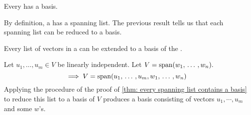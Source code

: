 \setcounter{thm}{30}
\begin{thm} 
  \label{thm: every finite-dimensional vector space has a basis}
  Every \findimvs has a basis.
\end{thm}
\begin{prf}
  By definition, a \fdvs has a spanning list. The previous result tells us that each spanning list can be reduced to a basis.
\end{prf}

\begin{thm}
  \label{thm: every linearly independent list of vectors in a finite-dimensional vector space can be extended to a basis of the vector space}
  Every \lid list of vectors in a  \findimvs can be extended to a basis of the \vs.
\end{thm}
\begin{prf}
  Let $u_1, \ldots, u_m \in V$ be linearly independent. Let $V=\operatorname{span} (w_1, {\, \ldots \,\,}, w_n).$
  \begin{equation}
    \implies V=\operatorname{span} (u_1, {\, \ldots \,\,} , u_m, w_1, {\, \ldots \,\,} , w_n )
  \end{equation}
  Applying the procedure of the proof of \ref{thm: every spanning list contains a basis} to reduce this list to a basis of $V$ produces a basis consisting of vectors $u_1, \cdots, u_m$ and some $w$'s.
\end{prf}

